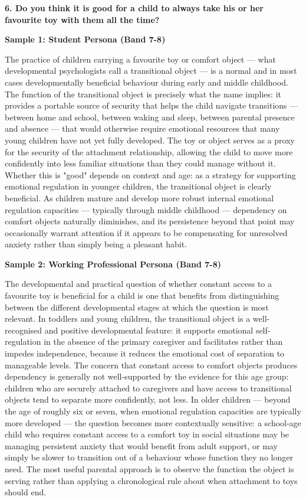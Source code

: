 \separator

\begin{ieltsquestion}
\textbf{6. Do you think it is good for a child to always take his or her favourite toy with them all the time?}
\end{ieltsquestion}
\textbf{Sample 1: Student Persona (Band 7-8)}

The practice of children carrying a favourite toy or comfort object — what developmental psychologists call a transitional object — is a normal and in most cases developmentally beneficial behaviour during early and middle childhood. The function of the transitional object is precisely what the name implies: it provides a portable source of security that helps the child navigate transitions — between home and school, between waking and sleep, between parental presence and absence — that would otherwise require emotional resources that many young children have not yet fully developed. The toy or object serves as a proxy for the security of the attachment relationship, allowing the child to move more confidently into less familiar situations than they could manage without it. Whether this is "good" depends on context and age: as a strategy for supporting emotional regulation in younger children, the transitional object is clearly beneficial. As children mature and develop more robust internal emotional regulation capacities — typically through middle childhood — dependency on comfort objects naturally diminishes, and its persistence beyond that point may occasionally warrant attention if it appears to be compensating for unresolved anxiety rather than simply being a pleasant habit.

\textbf{Sample 2: Working Professional Persona (Band 7-8)}

The developmental and practical question of whether constant access to a favourite toy is beneficial for a child is one that benefits from distinguishing between the different developmental stages at which the question is most relevant. In toddlers and young children, the transitional object is a well-recognised and positive developmental feature: it supports emotional self-regulation in the absence of the primary caregiver and facilitates rather than impedes independence, because it reduces the emotional cost of separation to manageable levels. The concern that constant access to comfort objects produces dependency is generally not well-supported by the evidence for this age group: children who are securely attached to caregivers and have access to transitional objects tend to separate more confidently, not less. In older children — beyond the age of roughly six or seven, when emotional regulation capacities are typically more developed — the question becomes more contextually sensitive: a school-age child who requires constant access to a comfort toy in social situations may be managing persistent anxiety that would benefit from adult support, or may simply be slower to transition out of a behaviour whose function they no longer need. The most useful parental approach is to observe the function the object is serving rather than applying a chronological rule about when attachment to toys should end.

